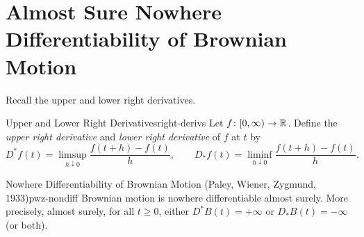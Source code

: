 
\section{Almost Sure Nowhere Differentiability of Brownian Motion}

Recall the upper and lower right derivatives.

\begin{definition}{Upper and Lower Right Derivatives}{right-derivs}
    Let $f \colon [0,\infty) \to \mathbb{R}$. Define the \emph{upper right derivative} and \emph{lower right derivative} of $f$ at $t$ by
    \[
        D^* f(t) = \limsup_{h \downarrow 0} \frac{f(t+h) - f(t)}{h}, \qquad
        D_* f(t) = \liminf_{h \downarrow 0} \frac{f(t+h) - f(t)}{h}.
    \]
\end{definition}

\begin{theorem}{Nowhere Differentiability of Brownian Motion (Paley, Wiener, Zygmund, 1933)}{pwz-nondiff}
    Brownian motion is nowhere differentiable almost surely. More precisely, almost surely, for all $t \geq 0$, either $D^* B(t) = +\infty$ or $D_* B(t) = -\infty$ (or both).
\end{theorem}

